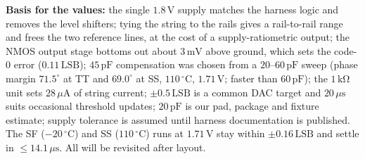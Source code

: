 \documentclass[10pt,a4paper]{article}
\begin{document}
\textbf{Basis for the values:} the single $1.8\,\mathrm{V}$ supply matches the harness logic and removes the level shifters; tying the string to the rails gives a rail-to-rail range and frees the two reference lines, at the cost of a supply-ratiometric output; the NMOS output stage bottoms out about $3\,\mathrm{mV}$ above ground, which sets the code-0 error ($0.11\,\mathrm{LSB}$); $45\,\mathrm{pF}$ compensation was chosen from a $20$--$60\,\mathrm{pF}$ sweep (phase margin $71.5^\circ$ at TT and $69.0^\circ$ at SS, $110\,^\circ$C, $1.71\,\mathrm{V}$; faster than $60\,\mathrm{pF}$); the $1\,\mathrm{k\Omega}$ unit sets $28\,\mu\mathrm{A}$ of string current; $\pm 0.5\,\mathrm{LSB}$ is a common DAC target and $20\,\mu\mathrm{s}$ suits occasional threshold updates; $20\,\mathrm{pF}$ is our pad, package and fixture estimate; supply tolerance is assumed until harness documentation is published. The SF ($-20\,^\circ$C) and SS ($110\,^\circ$C) runs at $1.71\,\mathrm{V}$ stay within $\pm 0.16\,\mathrm{LSB}$ and settle in $\leq 14.1\,\mu\mathrm{s}$. All will be revisited after layout.

\end{document}
